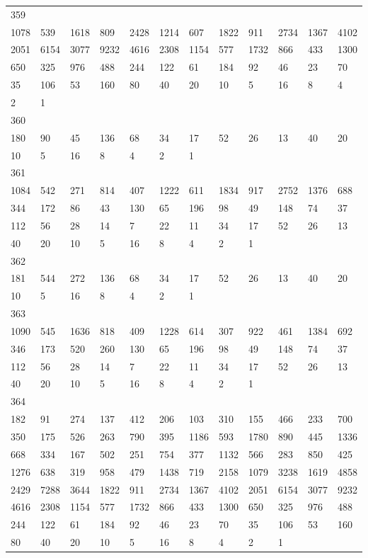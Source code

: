 \begin{longtable}{llllllllllll}
359&&&&&&&&&&&\\
1078& 539& 1618& 809& 2428& 1214& 607& 1822& 911& 2734& 1367& 4102\\
2051& 6154& 3077& 9232& 4616& 2308& 1154& 577& 1732& 866& 433& 1300\\
650& 325& 976& 488& 244& 122& 61& 184& 92& 46& 23& 70\\
35& 106& 53& 160& 80& 40& 20& 10& 5& 16& 8& 4\\
2& 1& \\

360&&&&&&&&&&&\\
180& 90& 45& 136& 68& 34& 17& 52& 26& 13& 40& 20\\
10& 5& 16& 8& 4& 2& 1& \\

361&&&&&&&&&&&\\
1084& 542& 271& 814& 407& 1222& 611& 1834& 917& 2752& 1376& 688\\
344& 172& 86& 43& 130& 65& 196& 98& 49& 148& 74& 37\\
112& 56& 28& 14& 7& 22& 11& 34& 17& 52& 26& 13\\
40& 20& 10& 5& 16& 8& 4& 2& 1& \\

362&&&&&&&&&&&\\
181& 544& 272& 136& 68& 34& 17& 52& 26& 13& 40& 20\\
10& 5& 16& 8& 4& 2& 1& \\

363&&&&&&&&&&&\\
1090& 545& 1636& 818& 409& 1228& 614& 307& 922& 461& 1384& 692\\
346& 173& 520& 260& 130& 65& 196& 98& 49& 148& 74& 37\\
112& 56& 28& 14& 7& 22& 11& 34& 17& 52& 26& 13\\
40& 20& 10& 5& 16& 8& 4& 2& 1& \\

364&&&&&&&&&&&\\
182& 91& 274& 137& 412& 206& 103& 310& 155& 466& 233& 700\\
350& 175& 526& 263& 790& 395& 1186& 593& 1780& 890& 445& 1336\\
668& 334& 167& 502& 251& 754& 377& 1132& 566& 283& 850& 425\\
1276& 638& 319& 958& 479& 1438& 719& 2158& 1079& 3238& 1619& 4858\\
2429& 7288& 3644& 1822& 911& 2734& 1367& 4102& 2051& 6154& 3077& 9232\\
4616& 2308& 1154& 577& 1732& 866& 433& 1300& 650& 325& 976& 488\\
244& 122& 61& 184& 92& 46& 23& 70& 35& 106& 53& 160\\
80& 40& 20& 10& 5& 16& 8& 4& 2& 1& \\


\end{longtable}
